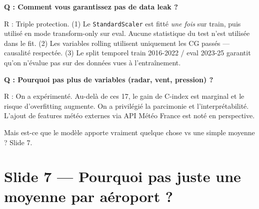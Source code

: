 \documentclass[11pt,a4paper]{article}
\begin{document}
\begin{piege}
\textbf{Q : Comment vous garantissez pas de data leak ?}

R : Triple protection. (1) Le \texttt{StandardScaler} est fitté \emph{une fois} sur train,
puis utilisé en mode \og transform-only \fg{} sur eval. Aucune statistique du test n'est
utilisée dans le fit. (2) Les variables rolling utilisent uniquement les CG passés —
causalité respectée. (3) Le split temporel train 2016-2022 / eval 2023-25 garantit qu'on
n'évalue pas sur des données vues à l'entraînement.

\textbf{Q : Pourquoi pas plus de variables (radar, vent, pression) ?}

R : On a expérimenté. Au-delà de ces 17, le gain de C-index est marginal et le risque
d'overfitting augmente. On a privilégié la parcimonie et l'interprétabilité. L'ajout de
features météo externes via API Météo France est noté en perspective.
\end{piege}

\begin{transit}
\og Mais est-ce que le modèle apporte vraiment quelque chose vs une simple moyenne ?
Slide 7. \fg{}
\end{transit}

\section{Slide 7 — Pourquoi pas juste une moyenne par aéroport ?}
\end{document}
